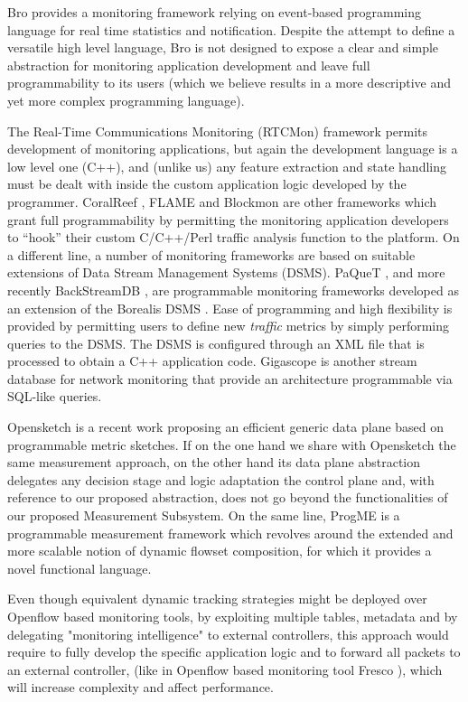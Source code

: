 \documentclass[conference,letterpaper]{sig-alternate-10pt}
\begin{document}
Bro \cite{bro} provides a monitoring framework relying on event-based programming language for real time
 statistics and notification. Despite the attempt to define a versatile high level language, Bro is not designed 
 to expose a clear and simple abstraction for monitoring application development and leave full programmability
  to its users (which we believe results in a more descriptive and yet more complex programming language).

The Real-Time Communications Monitoring (RTCMon) framework \cite{rtcmon} permits development of 
monitoring applications, but again the development language is a low level one (C++), and (unlike us) 
any feature extraction and state handling must be dealt with inside the custom application logic developed 
by the programmer.  CoralReef \cite{keys01coralarchitecture}, FLAME \cite{flame02} and Blockmon \cite{Block12} 
are other frameworks which grant full programmability by permitting the monitoring application developers to 
``hook'' their custom C/C++/Perl traffic analysis function to the platform. 
On a different line, a number of monitoring frameworks are based on suitable extensions of Data Stream 
Management Systems (DSMS). PaQueT \cite{lig08paquet}, and more recently BackStreamDB \cite{Back12}, 
are programmable monitoring frameworks developed as an extension of the Borealis DSMS \cite{borealis05}. 
Ease of programming and high flexibility is provided by permitting users to define new \emph{traffic} metrics 
by simply performing queries to the DSMS. The DSMS is configured through an XML file that is processed to 
obtain a C++ application code. Gigascope \cite{cranor03gigascope} is another stream database for network 
monitoring that provide an architecture programmable via SQL-like queries.

Opensketch \cite{opensk} is a recent work proposing an efficient generic data plane based on programmable 
metric sketches. If on the one hand we share with Opensketch the same measurement approach, on the other 
hand its data plane abstraction delegates any decision stage and logic adaptation the control plane and, with 
reference to our proposed abstraction, does not go beyond the functionalities of our proposed Measurement 
Subsystem. On the same line, ProgME \cite{progme} is a programmable measurement framework which revolves 
around the extended and more scalable notion of dynamic flowset composition, for which it provides 
a novel functional language. 

Even though equivalent dynamic tracking strategies might be deployed over Openflow based monitoring tools, 
by exploiting multiple tables, metadata and by delegating "monitoring intelligence"  to external controllers, this 
approach would require to fully develop the specific application logic and to forward all packets to an external 
controller, (like in Openflow based monitoring tool Fresco \cite{fresco}), which will increase complexity 
and affect performance.
\end{document}
